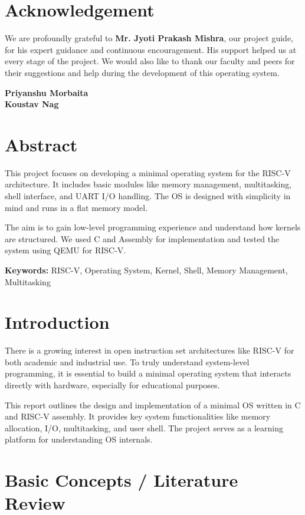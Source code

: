 \documentclass[a4paper,12pt]{report}
\begin{document}
\chapter*{Acknowledgement}
We are profoundly grateful to \textbf{Mr. Jyoti Prakash Mishra}, our project guide, for his expert guidance and continuous encouragement. His support helped us at every stage of the project. We would also like to thank our faculty and peers for their suggestions and help during the development of this operating system.

\vspace{1cm}
\noindent
\textbf{Priyanshu Morbaita} \\
\textbf{Koustav Nag}

\chapter*{Abstract}
This project focuses on developing a minimal operating system for the RISC-V architecture. It includes basic modules like memory management, multitasking, shell interface, and UART I/O handling. The OS is designed with simplicity in mind and runs in a flat memory model. 

\vspace{0.5cm}
The aim is to gain low-level programming experience and understand how kernels are structured. We used C and Assembly for implementation and tested the system using QEMU for RISC-V.

\textbf{Keywords:} RISC-V, Operating System, Kernel, Shell, Memory Management, Multitasking

\tableofcontents

\chapter{Introduction}
There is a growing interest in open instruction set architectures like RISC-V for both academic and industrial use. To truly understand system-level programming, it is essential to build a minimal operating system that interacts directly with hardware, especially for educational purposes.

This report outlines the design and implementation of a minimal OS written in C and RISC-V assembly. It provides key system functionalities like memory allocation, I/O, multitasking, and user shell. The project serves as a learning platform for understanding OS internals.

\chapter{Basic Concepts / Literature Review}
\end{document}
